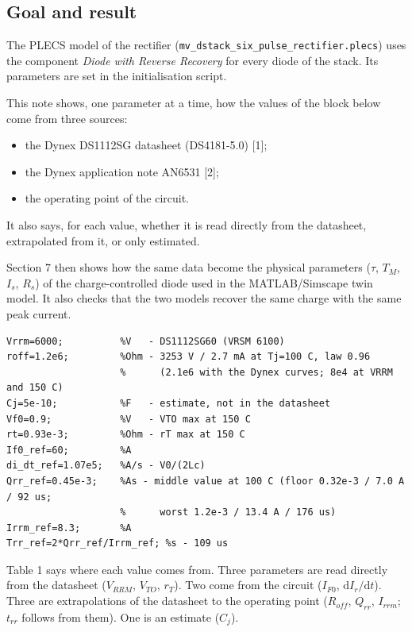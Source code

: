 \documentclass[11pt,a4paper,numbers=noenddot]{scrartcl}
\providecommand{\tightlist}{\setlength{\itemsep}{0pt}\setlength{\parskip}{0pt}}
\begin{document}
\begin{onehalfspace}
\section{Goal and result}\label{goal-and-result}

The PLECS model of the rectifier (\texttt{mv\_\allowbreak{}dstack\_\allowbreak{}six\_\allowbreak{}pulse\_\allowbreak{}rectifier.plecs}) uses the component \emph{Diode with Reverse Recovery} for every diode of the stack. Its parameters are set in the initialisation script.

This note shows, one parameter at a time, how the values of the block below come from three sources:

\begin{itemize}
\tightlist
\item
  the Dynex DS1112SG datasheet (DS4181-5.0) {[}1{]};
\item
  the Dynex application note AN6531 {[}2{]};
\item
  the operating point of the circuit.
\end{itemize}

It also says, for each value, whether it is read directly from the datasheet, extrapolated from it, or only estimated.

Section 7 then shows how the same data become the physical parameters (\(\tau\), \(T_M\), \(I_s\), \(R_s\)) of the charge-controlled diode used in the MATLAB/Simscape twin model. It also checks that the two models recover the same charge with the same peak current.

{\small\singlespacing\begin{verbatim}
Vrrm=6000;          %V   - DS1112SG60 (VRSM 6100)
roff=1.2e6;         %Ohm - 3253 V / 2.7 mA at Tj=100 C, law 0.96
                    %      (2.1e6 with the Dynex curves; 8e4 at VRRM and 150 C)
Cj=5e-10;           %F   - estimate, not in the datasheet
Vf0=0.9;            %V   - VTO max at 150 C
rt=0.93e-3;         %Ohm - rT max at 150 C
If0_ref=60;         %A
di_dt_ref=1.07e5;   %A/s - V0/(2Lc)
Qrr_ref=0.45e-3;    %As - middle value at 100 C (floor 0.32e-3 / 7.0 A / 92 us;
                    %      worst 1.2e-3 / 13.4 A / 176 us)
Irrm_ref=8.3;       %A
Trr_ref=2*Qrr_ref/Irrm_ref; %s - 109 us
\end{verbatim}}

Table 1 says where each value comes from. Three parameters are read directly from the datasheet (\(V_{RRM}\), \(V_{TO}\), \(r_T\)). Two come from the circuit (\(I_{F0}\), \(\mathrm{d}I_r/\mathrm{d}t\)). Three are extrapolations of the datasheet to the operating point (\(R_{off}\), \(Q_{rr}\), \(I_{rrm}\); \(t_{rr}\) follows from them). One is an estimate (\(C_j\)).


\end{onehalfspace}
\end{document}
